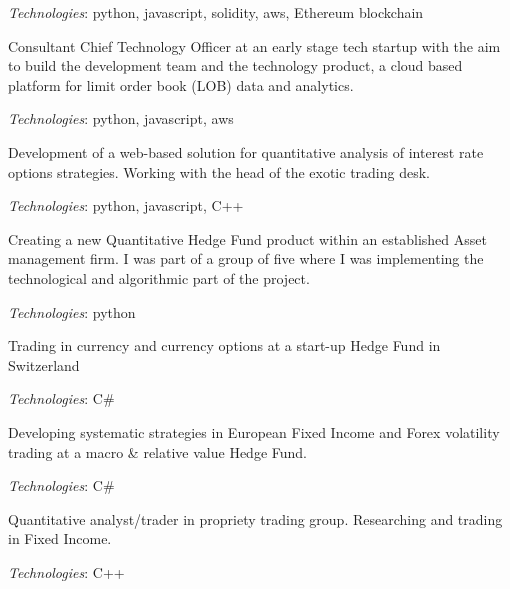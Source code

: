 {\it Technologies}: python, javascript, solidity, aws, Ethereum blockchain



Consultant Chief Technology Officer at an early stage tech startup with the aim to build the development team and the technology product,
a cloud based platform for limit order book (LOB) data and analytics.

{\it Technologies}: python, javascript, aws


Development of a web-based solution for quantitative analysis of interest rate options strategies.
Working with the head of the exotic trading desk.

{\it Technologies}: python, javascript, C++


Creating a new Quantitative Hedge Fund product within an established Asset management firm.
I was part of a group of five where I was implementing the technological and algorithmic part of the project.

{\it Technologies}: python


Trading in currency and currency options at a start-up Hedge Fund in Switzerland

{\it Technologies}: C\#


Developing systematic strategies in European Fixed Income and Forex volatility trading at a macro \& relative value Hedge Fund.

{\it Technologies}: C\#


Quantitative analyst/trader in propriety trading group. Researching and trading in Fixed Income.

{\it Technologies}: C++
